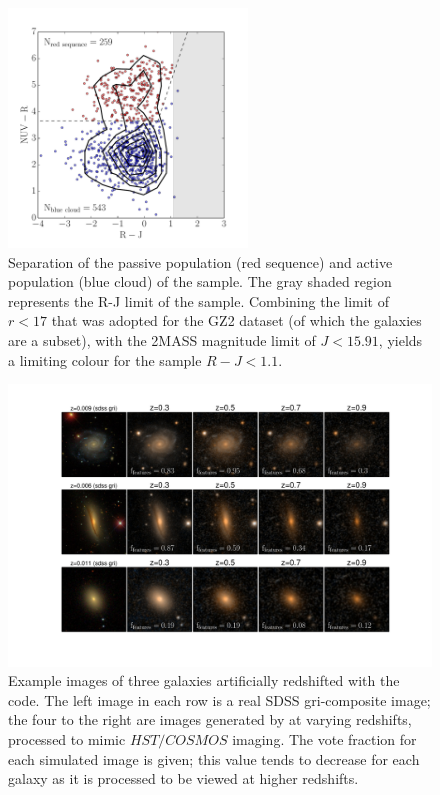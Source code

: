 \documentclass[useAMS,usenatbib]{mn2e}
\begin{document}
\begin{figure}
\centering
\includegraphics[width=2.5in,height=2.5in,trim={.5cm 0cm .5cm 0cm},clip]{figures/ferengi2_colorcolor.pdf}
\caption{Separation of the passive population (red sequence) and active population (blue cloud) of the  sample.  The gray shaded region represents the R-J limit of the sample. Combining the limit of $r<17$ that was adopted for the GZ2 dataset (of which the  galaxies are a subset), with the 2MASS magnitude limit of $J<15.91$, yields a limiting colour for the  sample $R-J<1.1$.}
\label{fig:ferengi2colorcolor}
\end{figure}

\begin{figure}
\centering
\includegraphics[width=\textwidth,trim={.5cm 3cm .5cm .5cm},clip]{figures/ferengi2_examples_with_fractions.pdf}
\caption{Example images of three galaxies artificially redshifted with the \ferengi{} code. The left image in each row is a real SDSS gri-composite image; the four to the right are images generated by \ferengi{} at varying redshifts, processed to mimic $HST/COSMOS$ imaging. The \ffeatures{} vote fraction for each simulated image is given; this value tends to decrease for each galaxy as it is processed to be viewed at higher redshifts. }
\label{fig:ferengi2example}
\end{figure}
\end{document}

